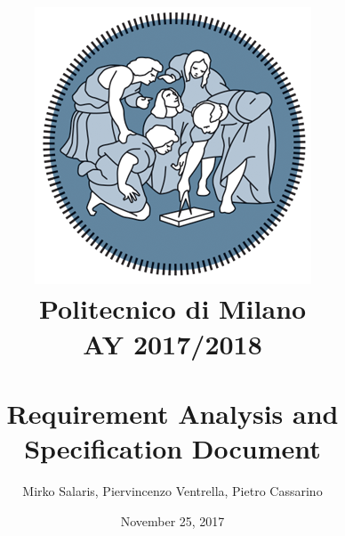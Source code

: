 \begin{titlepage}

\title{
	\includegraphics[scale=0.5]{Images/PolimiLogo}
	\\
	\normalsize{Politecnico di Milano}\\
	{AY 2017/2018}
	\bigskip\\
	\bigskip\\
	\LARGE{Requirement Analysis and Specification Document}
	\vfill
}

	\date{November 25, 2017}

\author{
	Mirko Salaris,
	Piervincenzo Ventrella,
	Pietro Cassarino
}

\maketitle
\thispagestyle{empty}

\end{titlepage}